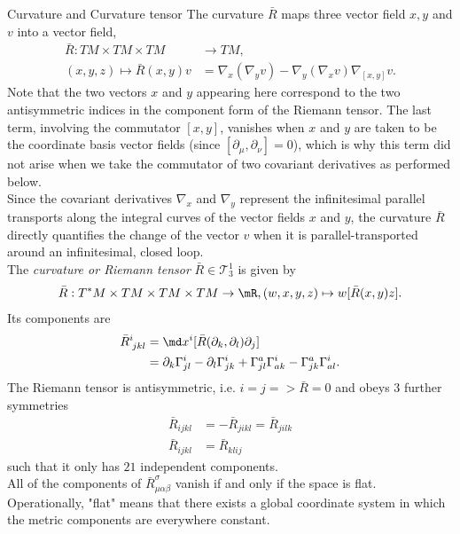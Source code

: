 \begin{mybox}{Curvature and Curvature tensor}
	The curvature $\bar{R}$ maps three vector field $x,y$ and $v$ into a vector field,
	\begin{align}
		\bar{R}:TM\times TM \times TM &\rightarrow TM,\\
		 (x,y,z) \mapsto \bar{R}(x,y) v &= \nabla_x(\nabla_y v) - \nabla_y(\nabla_x v) \nabla_{[x,y]} v.
	\end{align} 
Note that the two vectors $x$ and $y$ appearing here correspond
to the two antisymmetric indices in the component form of the Riemann tensor. The last
term, involving the commutator $[x, y ]$, vanishes when $x$ and $y$ are taken to be
the coordinate basis vector fields (since $[∂_μ , ∂_ν ] = 0$), which is why this term did not arise
when we take the commutator of two covariant derivatives as performed below.\\
Since the covariant derivatives $\nabla_x$ and $\nabla_y$ represent the infinitesimal parallel transports along the integral curves of the vector fields $x$ and $y$, the curvature $\bar{R}$ directly quantifies the change of the vector $v$ when it is parallel-transported around an infinitesimal, closed loop.
\\
The \emph{curvature or Riemann tensor} $\bar{R} \in \mathcal{T}^1_3$ is given by 
\begin{equation}
\bar{R}:T^*M\times TM \times TM \times TM \rightarrow \mR, (w,x,y,z) \mapsto w[\bar{R}(x,y)z].
\end{equation}
Its components are 
\begin{align}
\bar{R}^i_{\; j k l} &= \md x^i [\bar{R}(\partial_k, \partial_l) \partial_j] \\
							&= \partial_k \Gamma^i_{jl} - \partial_l \Gamma^i_{jk} + \Gamma^a_{jl} \Gamma^i_{ak} - \Gamma^a_{jk} \Gamma^i_{al}.
\end{align}
The Riemann tensor is antisymmetric, i.e. $i=j => \bar{R}=0$ and obeys $3$ further symmetries 
\begin{align}
	\bar{R}_{ijkl} &= -\bar{R}_{jikl} =\bar{R}_{jilk} \\
	\bar{R}_{ijkl} &= \bar{R}_{klij}
\end{align}
such that it only has $21$ independent components.\\
All of the components of $\bar{R}^{\sigma}_{\mu \alpha \beta}$ vanish if and only if the space is flat. Operationally, "flat" means that there exists a global coordinate system in which the metric components are everywhere constant.
\end{mybox}
